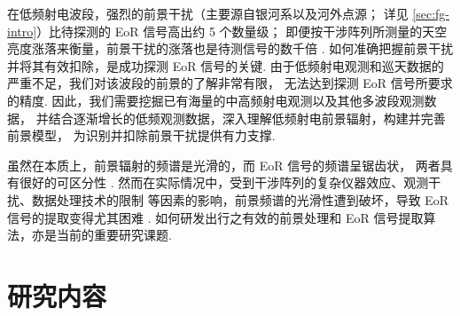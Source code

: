在低频射电波段，强烈的前景干扰（主要源自银河系以及河外点源；
详见 \autoref{sec:fg-intro}）比待探测的 EoR 信号高出约 5 个数量级；
即便按干涉阵列所测量的天空亮度涨落来衡量，前景干扰的涨落也是待测信号的数千倍
\cite{zaroubi2013}.
如何准确把握前景干扰并将其有效扣除，是成功探测 EoR 信号的关键.
由于低频射电观测和巡天数据的严重不足，我们对该波段的前景的了解非常有限，
无法达到探测 EoR 信号所要求的精度.
因此，我们需要挖掘已有海量的中高频射电观测以及其他多波段观测数据，
并结合逐渐增长的低频观测数据，深入理解低频射电前景辐射，构建并完善前景模型，
为识别并扣除前景干扰提供有力支撑.

虽然在本质上，前景辐射的频谱是光滑的，而 EoR 信号的频谱呈锯齿状，
两者具有很好的可区分性 \cite{wang2006,jelic2008,harker2009,wang2013}.
然而在实际情况中，受到干涉阵列的复杂仪器效应、观测干扰、数据处理技术的限制
等因素的影响，前景频谱的光滑性遭到破坏，导致 EoR 信号的提取变得尤其困难
\cite{liu2009ps,labropoulos2009,gehlot2018,mertens2018}.
如何研发出行之有效的前景处理和 EoR 信号提取算法，亦是当前的重要研究课题.


\section{研究内容}

